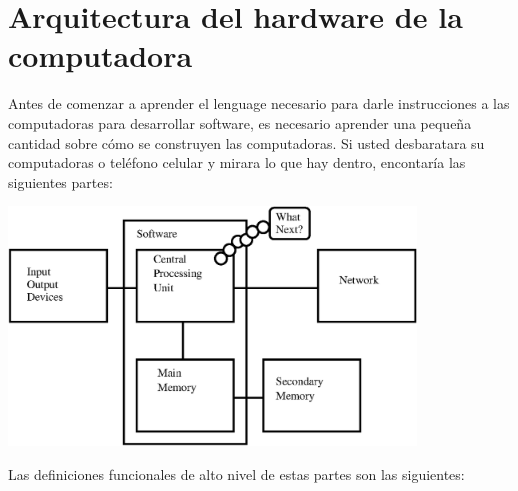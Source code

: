 \section{Arquitectura del hardware de la computadora}

Antes de comenzar a aprender el lenguage necesario para darle instrucciones a las computadoras para desarrollar software, es necesario aprender una peque\~na cantidad sobre c\'omo se construyen las computadoras. Si usted desbaratara su computadoras o tel\'efono celular y mirara lo que hay dentro, encontar\'ia las siguientes partes:

\beforefig
\centerline{\includegraphics[height=2.50in]{figs2/arch.eps}}
\afterfig

Las definiciones funcionales de alto nivel de estas partes son las siguientes:

